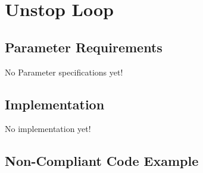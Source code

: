 %
%

\section{Unstop Loop}
\label{UnstopLoop::overview}


\subsection{Parameter Requirements}

   No Parameter specifications yet!

\subsection{Implementation}

   No implementation yet!

\subsection{Non-Compliant Code Example}


